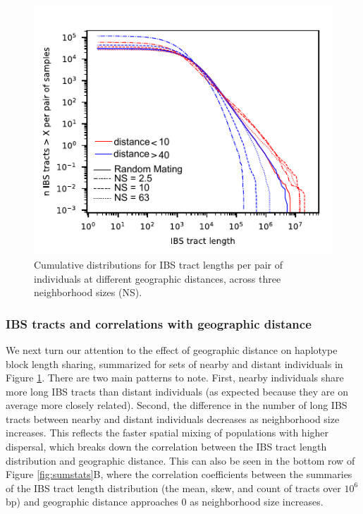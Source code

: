 \documentclass[10pt,twoside,lineno,hidelinks]{preprint}
\begin{document}
\begin{figure}[p]
\centering
\includegraphics[width=.5\textwidth]{figures/ibs_cumdists_w_rm.pdf}
\caption{Cumulative distributions for IBS tract lengths per pair of individuals at different geographic distances, across three neighborhood sizes (NS).}
\label{fig:ibs}
\end{figure}


\subsubsection{IBS tracts and correlations with geographic distance}

We next turn our attention to the effect of geographic distance on haplotype block length sharing, summarized for sets of nearby and distant individuals in Figure \ref{fig:ibs}. There are two main patterns to note. First, nearby individuals share more long IBS tracts than distant individuals (as expected because they are on average more closely related). Second, the difference in the number of long IBS tracts between nearby and distant individuals decreases as neighborhood size increases. This reflects the faster spatial mixing of populations with higher dispersal, which breaks down the correlation between the IBS tract length distribution and geographic distance. This can also be seen in the bottom row of Figure \ref{fig:sumstats}B, where the correlation coefficients between the summaries of the IBS tract length distribution (the mean, skew, and count of tracts over $10^6$bp) and geographic distance approaches 0 as neighborhood size increases. 

\end{document}
